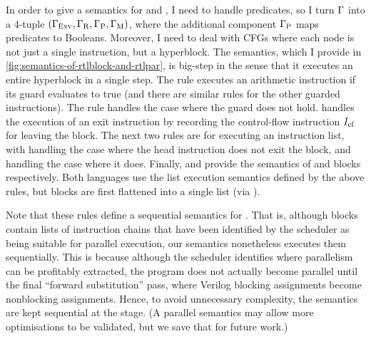 In order to give a semantics for \rtlblock{} and \rtlpar{}, I need to handle
predicates, so I turn $\Gamma$ into a 4-tuple
$(\Gamma_{\mathrm{\textsc{Env}}}, \Gamma_{\mathrm{R}}, \Gamma_{\mathrm{P}},
\Gamma_{\mathrm{M}})$, where the additional component
$\Gamma_{\mathrm{P}}$ maps predicates to Booleans.  Moreover, I need to
deal with CFGs where each node is not just a single instruction, but a
hyperblock. The semantics, which I provide in
\cref{fig:semantics-of-rtlblock-and-rtlpar}, is big-step in the sense that it
executes an entire hyperblock in a single step.  The 
rule executes an arithmetic instruction if its guard evaluates to true (and
there are similar rules for the other guarded instructions). The
 rule handles the case where the guard does not
hold.  handles the execution of an exit instruction by
recording the control-flow instruction $I_{\mathrm{cf}}$ for leaving the block. The
next two rules are for executing an instruction list, with
 handling the case where the head instruction does
not exit the block, and  handling the case where it
does. Finally,  and  provide
the semantics of \rtlblock{} and \rtlpar{} blocks respectively. Both languages
use the list execution semantics defined by the above rules, but \rtlpar{}
blocks are first flattened into a single list (via ).

Note that these rules define a sequential semantics for \rtlpar{}. That is,
although \rtlpar{} blocks contain lists of instruction chains that have been
identified by the scheduler as being suitable for parallel execution, our
semantics nonetheless executes them sequentially. This is because although the
scheduler identifies where parallelism can be profitably extracted, the program
does not actually become parallel until the final \enquote{forward substitution}
pass, where Verilog blocking assignments become nonblocking assignments. Hence,
to avoid unnecessary complexity, the semantics are kept sequential at the
\rtlpar{} stage. (A parallel \rtlpar{} semantics may allow more optimisations to
be validated, but we save that for future work.)

\newcommand\cons{\mathbin{::}}

